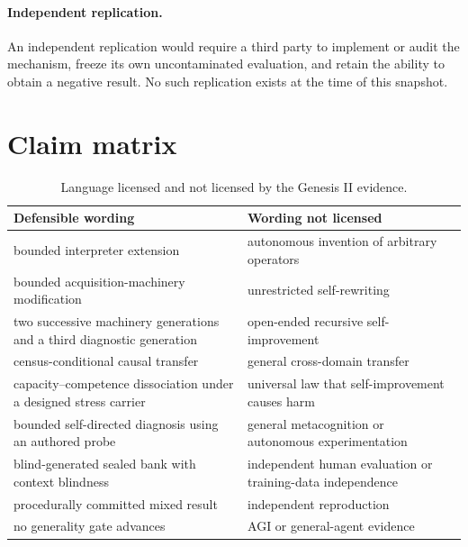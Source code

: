 \paragraph{Independent replication.}
An independent replication would require a third party to implement or audit the mechanism, freeze its own uncontaminated evaluation, and retain the ability to obtain a negative result. No such replication exists at the time of this snapshot.

\section{Claim matrix}
\label{app:claims}
\begin{table}[H]
\centering
\small
\caption{Language licensed and not licensed by the Genesis II evidence.}
\begin{tabularx}{\textwidth}{@{}X X@{}}
\toprule
Defensible wording & Wording not licensed \\
\midrule
bounded interpreter extension & autonomous invention of arbitrary operators \\
bounded acquisition-machinery modification & unrestricted self-rewriting \\
two successive machinery generations and a third diagnostic generation & open-ended recursive self-improvement \\
census-conditional causal transfer & general cross-domain transfer \\
capacity--competence dissociation under a designed stress carrier & universal law that self-improvement causes harm \\
bounded self-directed diagnosis using an authored probe & general metacognition or autonomous experimentation \\
blind-generated sealed bank with context blindness & independent human evaluation or training-data independence \\
procedurally committed mixed result & independent reproduction \\
no generality gate advances & AGI or general-agent evidence \\
\bottomrule
\end{tabularx}
\end{table}
